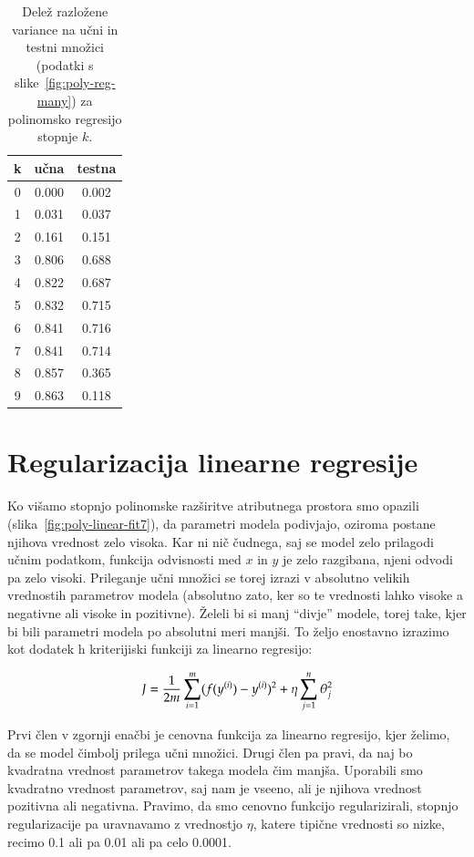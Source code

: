 \begin{table}
  \caption{Delež razložene variance na učni in testni množici (podatki s slike~\ref{fig:poly-reg-many}) za polinomsko regresijo stopnje $k$.}
  \begin{center}
  \begin{tabular}{ccc}
    \hline
    k & učna & testna \\
    \hline
    0 & 0.000 & 0.002 \\
    1 & 0.031 & 0.037 \\
    2 & 0.161 & 0.151 \\
    3 & 0.806 & 0.688 \\
    4 & 0.822 & 0.687 \\
    5 & 0.832 & 0.715 \\
    6 & 0.841 & 0.716 \\
    7 & 0.841 & 0.714 \\
    8 & 0.857 & 0.365 \\
    9 & 0.863 & 0.118 \\
    \hline
  \end{tabular}
  \end{center}
  \label{tab:poly-reg-many-res}
\end{table}

\section{Regularizacija linearne regresije}

Ko višamo stopnjo polinomske razširitve atributnega prostora smo opazili (slika~\ref{fig:poly-linear-fit7}), da parametri modela podivjajo, oziroma postane njihova vrednost zelo visoka. Kar ni nič čudnega, saj se model zelo prilagodi učnim podatkom, funkcija odvisnosti med $x$ in $y$ je zelo razgibana, njeni odvodi pa zelo visoki. Prileganje učni množici se torej izrazi v absolutno velikih vrednostih parametrov modela (absolutno zato, ker so te vrednosti lahko visoke a negativne ali visoke in pozitivne). Želeli bi si manj ``divje'' modele, torej take, kjer bi bili parametri modela po absolutni meri manjši. To željo enostavno izrazimo kot dodatek h kriterijiski funkciji za linearno regresijo:

\begin{equation}
J = {1\over 2m}\sum_{i=1}^m (f(y^{(i)})-y^{(i)})^2 + \eta\sum_{j=1}^n \theta_j^2
\end{equation}

Prvi člen v zgornji enačbi je cenovna funkcija za linearno regresijo, kjer želimo, da se model čimbolj prilega učni množici. Drugi člen pa pravi, da naj bo kvadratna vrednost parametrov takega modela čim manjša. Uporabili smo kvadratno vrednost parametrov, saj nam je vseeno, ali je njihova vrednost pozitivna ali negativna. Pravimo, da smo cenovno funkcijo regularizirali, stopnjo regularizacije pa uravnavamo z vrednostjo $\eta$, katere tipične vrednosti so nizke, recimo 0.1 ali pa 0.01 ali pa celo 0.0001.

